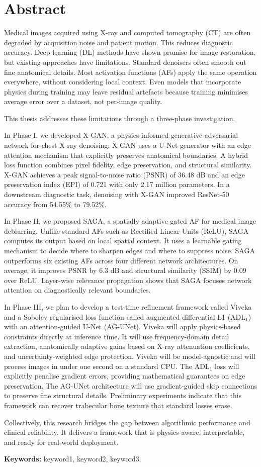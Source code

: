 \section*{Abstract}

Medical images acquired using X-ray and computed tomography (CT) are often degraded by acquisition noise and patient motion. This reduces diagnostic accuracy. Deep learning (DL) methods have shown promise for image restoration, but existing approaches have limitations. Standard denoisers often smooth out fine anatomical details. Most activation functions (AFs) apply the same operation everywhere, without considering local context. Even models that incorporate physics during training may leave residual artefacts because training minimises average error over a dataset, not per-image quality.

This thesis addresses these limitations through a three-phase investigation.

In Phase I, we developed X-GAN, a physics-informed generative adversarial network for chest X-ray denoising. X-GAN uses a U-Net generator with an edge attention mechanism that explicitly preserves anatomical boundaries. A hybrid loss function combines pixel fidelity, edge preservation, and structural similarity. X-GAN achieves a peak signal-to-noise ratio (PSNR) of 36.48 dB and an edge preservation index (EPI) of 0.721 with only 2.17 million parameters. In a downstream diagnostic task, denoising with X-GAN improved ResNet-50 accuracy from 54.55\% to 79.52\%.

In Phase II, we proposed SAGA, a spatially adaptive gated AF for medical image deblurring. Unlike standard AFs such as Rectified Linear Units (ReLU), SAGA computes its output based on local spatial context. It uses a learnable gating mechanism to decide where to sharpen edges and where to suppress noise. SAGA outperforms six existing AFs across four different network architectures. On average, it improves PSNR by 6.3 dB and structural similarity (SSIM) by 0.09 over ReLU. Layer-wise relevance propagation shows that SAGA focuses network attention on diagnostically relevant boundaries.

In Phase III, we plan to develop a test-time refinement framework called Viveka and a Sobolev-regularised loss function called augmented differential L1  (ADL\(_1\)) with an attention-guided U-Net (AG-UNet). Viveka will apply physics-based constraints directly at inference time. It will use frequency-domain detail extraction, anatomically adaptive gains based on X-ray attenuation coefficients, and uncertainty-weighted edge protection. Viveka will be model-agnostic and will process images in under one second on a standard CPU. The ADL\(_1\) loss will explicitly penalise gradient errors, providing mathematical guarantees on edge preservation. The AG-UNet architecture will use gradient-guided skip connections to preserve fine structural details. Preliminary experiments indicate that this framework can recover trabecular bone texture that standard losses erase.

Collectively, this research bridges the gap between algorithmic performance and clinical reliability. It delivers a framework that is physics-aware, interpretable, and ready for real-world deployment.

\noindent\textbf{Keywords:} keyword1, keyword2, keyword3.
